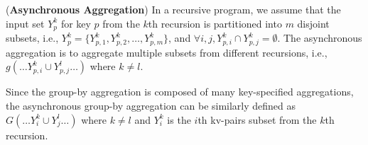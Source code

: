 {

\begin{definition}
	\label{def:asyncaggre}
	(\textbf{Asynchronous Aggregation}) In a recursive program, we assume that the input set $Y_{p}^k$ for key $p$ from the $k$th recursion is partitioned into $m$ disjoint subsets, i.e., $Y_{p}^k=\{Y_{p,1}^k,Y_{p,2}^k,\ldots,Y_{p,m}^k\}$, and $\forall i,j, Y_{p,i}^k\cap Y_{p,j}^k=\emptyset$. The asynchronous aggregation is to aggregate multiple subsets from different recursions, i.e., $g(\ldots Y_{p,i}^k\cup Y_{p,j}^{l}\ldots)$ where $k\neq l$.
\end{definition}

Since the group-by aggregation is composed of many key-specified aggregations, the asynchronous group-by aggregation can be similarly defined as $G(\ldots Y_{i}^k\cup Y_{j}^{l}\ldots)$ where $k\neq l$ and $Y_i^k$ is the $i$th kv-pairs subset from the $k$th recursion.


}
